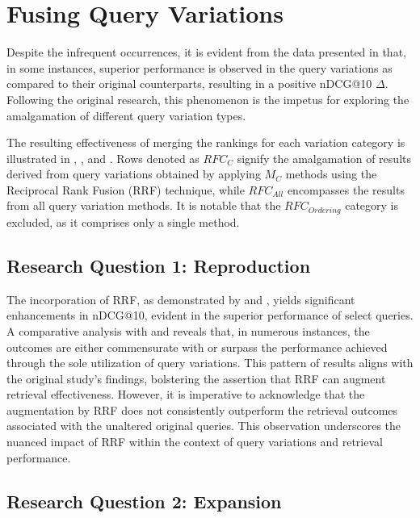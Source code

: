 \section{Fusing Query Variations}
Despite the infrequent occurrences, it is evident from the data presented in  that, in some instances, superior performance is observed in the query variations as compared to their original counterparts, resulting in a positive nDCG@10 $\Delta$. Following the original research, this phenomenon is the impetus for exploring the amalgamation of different query variation types.

The resulting effectiveness of merging the rankings for each variation category is illustrated in , , and . Rows denoted as $ RFC_C $ signify the amalgamation of results derived from query variations obtained by applying $ M_C $ methods using the Reciprocal Rank Fusion (RRF) technique, while $ RFC_{All} $ encompasses the results from all query variation methods. It is notable that the $ RFC_{Ordering} $ category is excluded, as it comprises only a single method.

\subsection{Research Question 1: Reproduction}


The incorporation of RRF, as demonstrated by  and , yields significant enhancements in nDCG@10, evident in the superior performance of select queries. A comparative analysis with  and  reveals that, in numerous instances, the outcomes are either commensurate with or surpass the performance achieved through the sole utilization of query variations. This pattern of results aligns with the original study's findings, bolstering the assertion that RRF can augment retrieval effectiveness. However, it is imperative to acknowledge that the augmentation by RRF does not consistently outperform the retrieval outcomes associated with the unaltered original queries. This observation underscores the nuanced impact of RRF within the context of query variations and retrieval performance.

\subsection{Research Question 2: Expansion}


